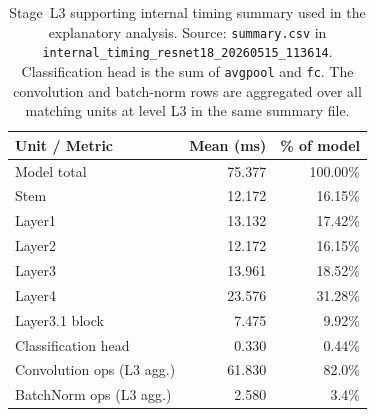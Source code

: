 \begin{table}[t]
\centering
\caption[Stage~L3 internal timing summary]{Stage~L3 supporting internal timing summary used in the explanatory analysis. Source: \texttt{summary.csv} in \texttt{internal\_timing\_resnet18\_20260515\_113614}. Classification head is the sum of \texttt{avgpool} and \texttt{fc}. The convolution and batch-norm rows are aggregated over all matching units at level L3 in the same summary file.}
\label{tab:rq13-internal-summary}
\begin{tabular}{lrr}
\toprule
\textbf{Unit / Metric} & \textbf{Mean (ms)} & \textbf{\% of model} \\
\midrule
Model total            & 75.377 & 100.00\% \\
Stem                   & 12.172 & 16.15\% \\
Layer1                 & 13.132 & 17.42\% \\
Layer2                 & 12.172 & 16.15\% \\
Layer3                 & 13.961 & 18.52\% \\
Layer4                 & 23.576 & 31.28\% \\
Layer3.1 block         & 7.475  & 9.92\% \\
Classification head    & 0.330  & 0.44\% \\
Convolution ops (L3 agg.) & 61.830 & 82.0\% \\
BatchNorm ops (L3 agg.)   &  2.580 & 3.4\% \\
\bottomrule
\end{tabular}
\end{table}

